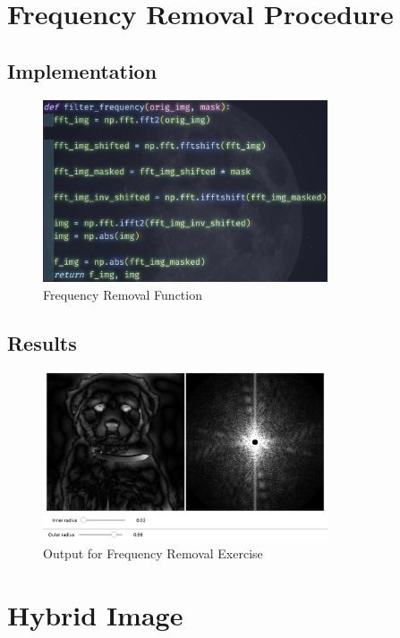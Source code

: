 \newpage
\section{Frequency Removal Procedure}
\subsection{Implementation}
\begin{figure} [!h]
    \centering
    \includegraphics[width=0.75\textwidth]{img/code/freq.png}
    \caption{Frequency Removal Function}
\end{figure}

\subsection{Results}
\begin{figure} [!h]
    \centering
    \includegraphics[width=0.75\textwidth]{img/freq.png}
    \caption{Output for Frequency Removal Exercise}
\end{figure}

\section{Hybrid Image}
